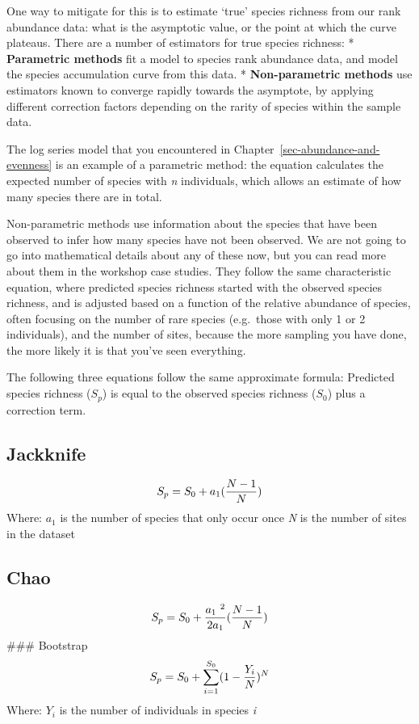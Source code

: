 \documentclass[
  letterpaper,
  DIV=11,
  numbers=noendperiod]{scrreprt}
\begin{document}
One way to mitigate for this is to estimate `true' species richness from
our rank abundance data: what is the asymptotic value, or the point at
which the curve plateaus. There are a number of estimators for true
species richness: * \textbf{Parametric methods} fit a model to species
rank abundance data, and model the species accumulation curve from this
data. * \textbf{Non-parametric methods} use estimators known to converge
rapidly towards the asymptote, by applying different correction factors
depending on the rarity of species within the sample data.

The log series model that you encountered in
Chapter~\ref{sec-abundance-and-evenness} is an example of a parametric
method: the equation calculates the expected number of species with
\emph{n} individuals, which allows an estimate of how many species there
are in total.

Non-parametric methods use information about the species that have been
observed to infer how many species have not been observed. We are not
going to go into mathematical details about any of these now, but you
can read more about them in the workshop case studies. They follow the
same characteristic equation, where predicted species richness started
with the observed species richness, and is adjusted based on a function
of the relative abundance of species, often focusing on the number of
rare species (e.g.~those with only 1 or 2 individuals), and the number
of sites, because the more sampling you have done, the more likely it is
that you've seen everything.

The following three equations follow the same approximate formula:
Predicted species richness (\(S_p\)) is equal to the observed species
richness (\(S_0\)) plus a correction term.

\subsection{Jackknife}\label{jackknife}

\[
S_p = S_0 + a_1({{N - 1}\over N})
\] Where: \(a_1\) is the number of species that only occur once \emph{N}
is the number of sites in the dataset

\subsection{Chao}\label{chao}

\[
S_p = S_0 + {a_1~^2\over 2a_1}({{N - 1} \over N})
\] \#\#\# Bootstrap \[
S_p = S_0 + \sum^{S_0}_{i = 1} (1 - {Y_i \over N})^N
\] Where: \(Y_i\) is the number of individuals in species \emph{i}
\end{document}
